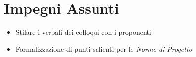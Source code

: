 \documentclass[a4paper, 12pt]{article}
\begin{document}
\section*{Impegni Assunti}
\begin{itemize}
    \item Stilare i verbali dei colloqui con i proponenti
    \item Formalizzazione di punti salienti per le \textit{Norme di Progetto}
\end{itemize}
\end{document}
